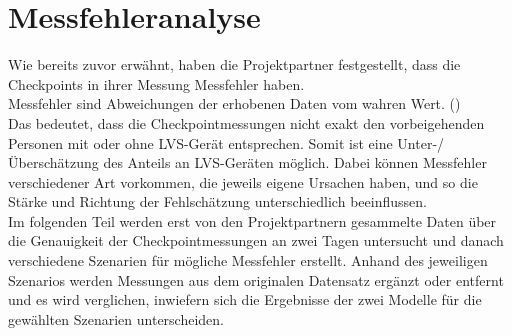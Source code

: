 \documentclass[12pt]{scrreprt}
\begin{document}
\chapter{Messfehleranalyse}
\label{chap:Messfehleranalyse}
Wie bereits zuvor erwähnt, haben die Projektpartner festgestellt, dass die Checkpoints in ihrer Messung Messfehler haben. \\
Messfehler sind Abweichungen der erhobenen Daten vom wahren Wert. (\cite{messfehler}) \\
Das bedeutet, dass die Checkpointmessungen nicht exakt den vorbeigehenden Personen mit oder ohne LVS-Gerät entsprechen. Somit ist eine Unter-/Überschätzung des Anteils an LVS-Geräten möglich. Dabei können Messfehler verschiedener Art vorkommen, die jeweils eigene Ursachen haben, und so die Stärke und Richtung der Fehlschätzung unterschiedlich beeinflussen. \\
Im folgenden Teil werden erst von den Projektpartnern gesammelte Daten über die Genauigkeit der Checkpointmessungen an zwei Tagen untersucht und danach verschiedene Szenarien für mögliche Messfehler erstellt. Anhand des jeweiligen Szenarios werden Messungen aus dem originalen Datensatz ergänzt oder entfernt und es wird verglichen, inwiefern sich die Ergebnisse der zwei Modelle für die gewählten Szenarien unterscheiden.
\end{document}
